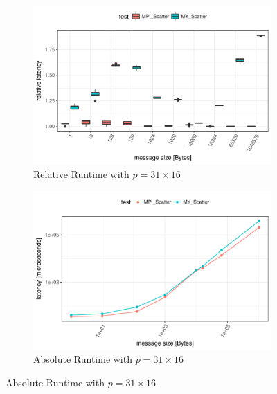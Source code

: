 \begin{figure}[h]
    \centering
    
    \begin{subfigure}[b]{0.49\textwidth}
        \includegraphics[width=\textwidth]{../benchmarks/mpich/divide_conquer/scatter_31/rel_runtime.pdf}
        \caption{Relative Runtime with $p=31 \times 16$}
        \label{fig:Scatter:MPICH:Rel:31}
    \end{subfigure}
    \begin{subfigure}[b]{0.49\textwidth}
        \includegraphics[width=\textwidth]{../benchmarks/mpich/divide_conquer/scatter_31/runtime.pdf}
        \caption{Absolute Runtime with $p=31 \times 16$}
        \label{fig:Scatter:MPICH:Abs:31}
    \end{subfigure}
    

\end{figure}

